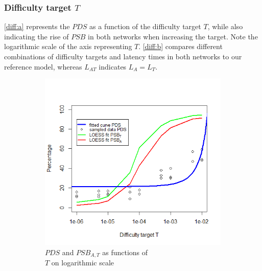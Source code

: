 \documentclass[a4paper,12pt,twoside]{report}
\begin{document}
\subsubsection{Difficulty target $T$}
\autoref{diff:a} represents the $PDS$ as a function of the difficulty target $T$, while also indicating the rise of $PSB$ in both networks when increasing the target. Note the logarithmic scale of the axis representing $T$. \autoref{diff:b} compares different combinations of difficulty targets and latency times in both networks to our reference model, whereas $L_{AT}$ indicates $L_{A} = L_{T}$.\begin{figure}[hb!]
\centering
\begin{subfigure}{.5\textwidth}
  \centering
  \includegraphics[width=\linewidth]{Experiments/Difficulty/difficultyfit.png}
  \caption{$PDS$ and $PSB_{A,T}$ as functions of \\ $T$ on logarithmic scale}
  \label{diff:a}
\end{subfigure}%
\begin{subfigure}{.5\textwidth}
  \centering

\end{subfigure}
\end{figure}
\end{document}
